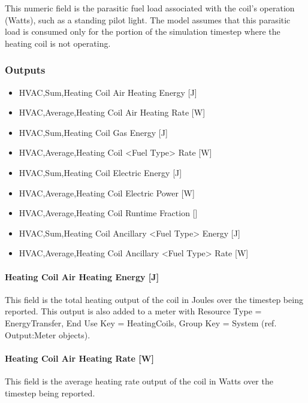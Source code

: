This numeric field is the parasitic fuel load associated with the coil's operation (Watts), such as a standing pilot light. The model assumes that this parasitic load is consumed only for the portion of the simulation timestep where the heating coil is not operating.

\subsubsection{Outputs}\label{outputs-9-002}

\begin{itemize}
\item
  HVAC,Sum,Heating Coil Air Heating Energy {[}J{]}
\item
  HVAC,Average,Heating Coil Air Heating Rate {[}W{]}
\item
  HVAC,Sum,Heating Coil Gas Energy {[}J{]}
\item
  HVAC,Average,Heating Coil <Fuel Type> Rate {[}W{]}
\item
  HVAC,Sum,Heating Coil Electric Energy {[}J{]}
\item
  HVAC,Average,Heating Coil Electric Power {[}W{]}
\item
  HVAC,Average,Heating Coil Runtime Fraction {[]}
\item
  HVAC,Sum,Heating Coil Ancillary <Fuel Type> Energy {[}J{]}
\item
  HVAC,Average,Heating Coil Ancillary <Fuel Type> Rate {[}W{]}
\end{itemize}

\paragraph{Heating Coil Air Heating Energy {[}J{]}}\label{heating-coil-air-heating-energy-j-2}

This field is the total heating output of the coil in Joules over the timestep being reported. This output is also added to a meter with Resource Type = EnergyTransfer, End Use Key = HeatingCoils, Group Key = System (ref. Output:Meter objects).

\paragraph{Heating Coil Air Heating Rate {[}W{]}}\label{heating-coil-air-heating-rate-w-2}

This field is the average heating rate output of the coil in Watts over the timestep being reported.


